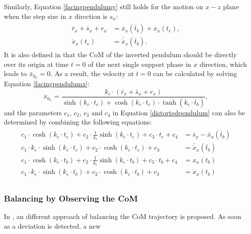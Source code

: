 Similarly, Equation {\ref{facingpendulumy}} still holds for the motion on $ x-z $ plane when the step size in $ x $ direction is $ s_x $:
\begin{align}
\label{facingpendulumx}
\begin{split}
\bar{r}_x+\bar{s}_x+r_x &= \bar{x}_x(\bar{t}_b)+x_x(t_e),\\
\dot{x}_x(t_e)&=\bar{\dot{x}}_x(\bar{t}_b).
\end{split}
\end{align} 
It is also defined in \cite{Humanoids-Graf-Roefer-10} that the CoM of the inverted pendulum should be directly over its origin at time $ t=0 $ of the next single support phase in $ x $ direction, which leads to $ \bar{x}_{0_x} = 0 $. As a result, the velocity at $ t=0 $ can be calculated by solving Equation {\ref{facingpendulumx}}:
\begin{equation}
\dot{x}_{0_x}=\frac{k_c\cdot\left(\bar{r}_x+\bar{s}_x+r_x\right)}{\sinh(k_c\cdot t_e)+\cosh(k_c\cdot t_e)\cdot\tanh(k_c\cdot\bar{t}_b)},
\end{equation} 
and the parameters $ c_1 $, $ c_2 $, $ c_3 $ and $ c_4 $ in Equation {\ref{distortedpendulum}} can also be determined by combining the following equations:
\begin{align}
\begin{split}
c_1\cdot\cosh(k_c\cdot t_e) + c_2\cdot\frac{1}{k_c}\sinh(k_c\cdot t_e)+c_3\cdot t_e + c_4 &= \bar{s}_x-\bar{x}_x(\bar{t}_b)\\
c_1\cdot k_c\cdot \sinh(k_c\cdot t_e)+c_2\cdot\cosh(k_c\cdot t_e)+c_3 &= \bar{\dot{x}}_x(\bar{t}_b)\\
c_1\cdot\cosh(k_c\cdot t_b) + c_2\cdot\frac{1}{k_c}\sinh(k_c\cdot t_b)+c_3\cdot t_b + c_4 &= x_x(t_b)\\
c_1\cdot k_c\cdot \sinh(k_c\cdot t_b)+c_2\cdot\cosh(k_c\cdot t_b)+c_3 &= \dot{x}_x(t_b)\\			
\end{split}
\end{align}



\subsubsection{Balancing by Observing the CoM}
In \cite{graf2011center}, an different approach of balancing the CoM trajectory is proposed. As soon as a deviation is detected, a new





